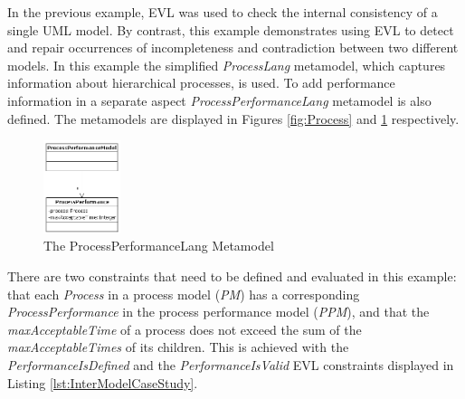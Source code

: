 In the previous example, EVL was used to check the internal consistency of a single UML model. By contrast, this example demonstrates using EVL to detect and repair occurrences of incompleteness and contradiction between two different models. In this example the simplified \emph{ProcessLang} metamodel, which captures information about hierarchical processes, is used. To add performance information in a separate aspect \emph{ProcessPerformanceLang} metamodel is also defined. The metamodels are displayed in Figures \ref{fig:Process} and \ref{fig:ProcessPerformance} respectively.

\begin{figure}[h]
	\centering
		\includegraphics[width=0.2\textwidth]{images/ProcessPerformance.png}
	\caption{The ProcessPerformanceLang Metamodel}
	\label{fig:ProcessPerformance}
\end{figure}

There are two constraints that need to be defined and evaluated in this example: that each \emph{Process} in a process model (\emph{PM}) has a corresponding \emph{ProcessPerformance} in the process performance model (\emph{PPM}), and that the \emph{maxAcceptableTime} of a process does not exceed the sum of the \emph{maxAcceptableTimes} of its children. This is achieved with the \emph{PerformanceIsDefined} and the \emph{PerformanceIsValid} EVL constraints displayed in Listing \ref{lst:InterModelCaseStudy}.


